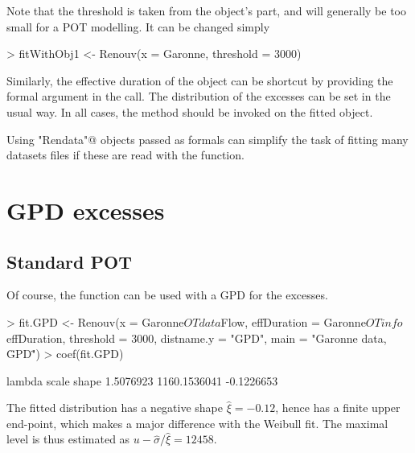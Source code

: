\documentclass[a4paper]{report}
\begin{document}
\noindent
Note that the threshold is taken from the \verb@Rendata@ object's \verb@OTdata@ part, and
will generally be too small for a POT modelling. It can be changed
simply

\begin{Schunk}
\begin{Sinput}
> fitWithObj1 <- Renouv(x = Garonne, threshold = 3000)
\end{Sinput}
\end{Schunk}

\noindent
Similarly, the effective duration of the object can
be shortcut by providing the \verb@effDuration@ formal argument 
in the call. The distribution of the excesses can be set in the usual way.
In all cases, the \verb@summary@ method should be invoked on the fitted 
object.

Using \verb@"Rendata"@ objects passed as \verb@x@ formals can simplify the task 
of fitting many datasets files if these are read with the \verb@readXML@ function.

\section{GPD excesses}

\subsection{Standard POT}
Of course, the \verb@Renouv@ function can be used with a GPD for the excesses.

\begin{Schunk}
\begin{Sinput}
> fit.GPD <- Renouv(x = Garonne$OTdata$Flow, effDuration = Garonne$OTinfo$effDuration, 
                    threshold = 3000, distname.y = "GPD",
                    main = "Garonne data, \"GPD\"")
> coef(fit.GPD)
\end{Sinput}
\begin{Soutput}
      lambda        scale        shape 
   1.5076923 1160.1536041   -0.1226653 
\end{Soutput}
\end{Schunk}

\noindent
The fitted distribution has a negative shape 
$\widehat{\xi} = -0.12$, hence
has a finite upper end-point, which makes a major difference with the 
Weibull fit. The maximal level is thus estimated
as $u - \widehat{\sigma}/\widehat{\xi} =   
12458$. 
\end{document}
